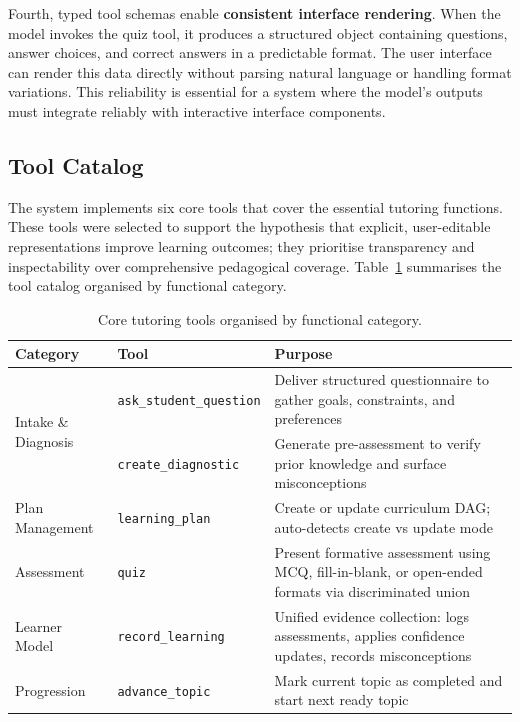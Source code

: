 \documentclass[logo,bsc,singlespacing,parskip,online]{infthesis}
\begin{document}
Fourth, typed tool schemas enable \textbf{consistent interface rendering}. When the model invokes the quiz tool, it produces a structured object containing questions, answer choices, and correct answers in a predictable format. The user interface can render this data directly without parsing natural language or handling format variations. This reliability is essential for a system where the model's outputs must integrate reliably with interactive interface components.

\subsection{Tool Catalog}

The system implements six core tools that cover the essential tutoring functions. These tools were selected to support the hypothesis that explicit, user-editable representations improve learning outcomes; they prioritise transparency and inspectability over comprehensive pedagogical coverage. Table~\ref{tab:tool-catalog} summarises the tool catalog organised by functional category.

\begin{table}[ht]
\centering
\caption{Core tutoring tools organised by functional category.}
\label{tab:tool-catalog}
\begin{tabular}{llp{6cm}}
\toprule
\textbf{Category} & \textbf{Tool} & \textbf{Purpose} \\
\midrule
\multirow{2}{*}{Intake \& Diagnosis}
  & \texttt{ask\_student\_question} & Deliver structured questionnaire to gather goals, constraints, and preferences \\
  & \texttt{create\_diagnostic} & Generate pre-assessment to verify prior knowledge and surface misconceptions \\
\midrule
Plan Management
  & \texttt{learning\_plan} & Create or update curriculum DAG; auto-detects create vs update mode \\
\midrule
Assessment
  & \texttt{quiz} & Present formative assessment using MCQ, fill-in-blank, or open-ended formats via discriminated union \\
\midrule
Learner Model
  & \texttt{record\_learning} & Unified evidence collection: logs assessments, applies confidence updates, records misconceptions \\
\midrule
Progression
  & \texttt{advance\_topic} & Mark current topic as completed and start next ready topic \\
\bottomrule
\end{tabular}
\end{table}
\end{document}
